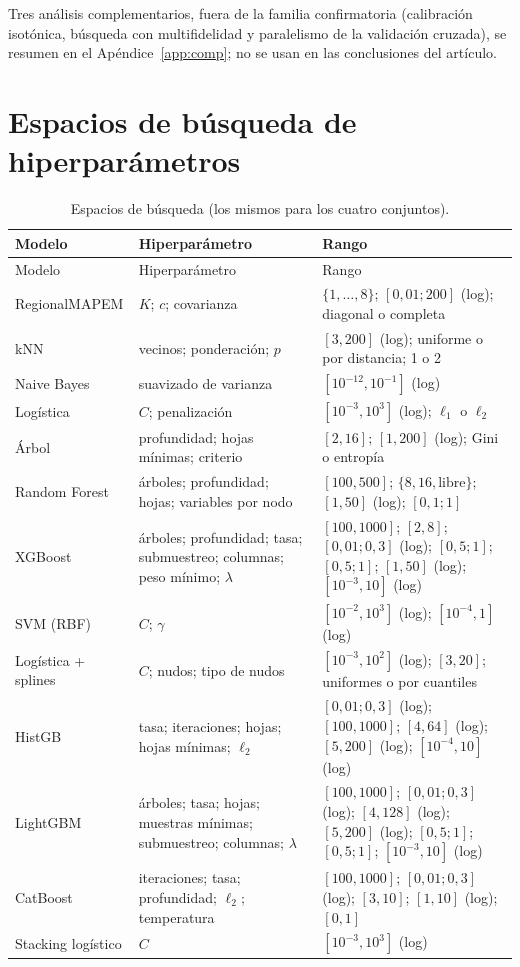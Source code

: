 \documentclass[11pt,a4paper]{article}
\begin{document}
Tres análisis complementarios, fuera de la familia confirmatoria (calibración isotónica, búsqueda con multifidelidad y paralelismo de la validación cruzada), se resumen en el Apéndice~\ref{app:comp}; no se usan en las conclusiones del artículo.

\section{Espacios de búsqueda de hiperparámetros}\label{app:espacios}
{\small
\begin{longtable}{p{2.6cm}p{4.4cm}p{7.2cm}}
\caption{Espacios de búsqueda (los mismos para los cuatro conjuntos).}\label{tab:espacios}\\
\toprule
Modelo & Hiperparámetro & Rango \\
\midrule
\endfirsthead
\toprule
Modelo & Hiperparámetro & Rango \\
\midrule
\endhead
RegionalMAPEM & $K$; $c$; covarianza & $\{1,\dots,8\}$; $[0{,}01;200]$ (log); diagonal o completa \\
kNN & vecinos; ponderación; $p$ & $[3,200]$ (log); uniforme o por distancia; 1 o 2 \\
Naive Bayes & suavizado de varianza & $[10^{-12},10^{-1}]$ (log) \\
Logística & $C$; penalización & $[10^{-3},10^{3}]$ (log); $\ell_1$ o $\ell_2$ \\
Árbol & profundidad; hojas mínimas; criterio & $[2,16]$; $[1,200]$ (log); Gini o entropía \\
Random Forest & árboles; profundidad; hojas; variables por nodo & $[100,500]$; $\{8,16,\text{libre}\}$; $[1,50]$ (log); $[0{,}1;1]$ \\
XGBoost & árboles; profundidad; tasa; submuestreo; columnas; peso mínimo; $\lambda$ & $[100,1000]$; $[2,8]$; $[0{,}01;0{,}3]$ (log); $[0{,}5;1]$; $[0{,}5;1]$; $[1,50]$ (log); $[10^{-3},10]$ (log) \\
SVM (RBF) & $C$; $\gamma$ & $[10^{-2},10^{3}]$ (log); $[10^{-4},1]$ (log) \\
Logística + splines & $C$; nudos; tipo de nudos & $[10^{-3},10^{2}]$ (log); $[3,20]$; uniformes o por cuantiles \\
HistGB & tasa; iteraciones; hojas; hojas mínimas; $\ell_2$ & $[0{,}01;0{,}3]$ (log); $[100,1000]$; $[4,64]$ (log); $[5,200]$ (log); $[10^{-4},10]$ (log) \\
LightGBM & árboles; tasa; hojas; muestras mínimas; submuestreo; columnas; $\lambda$ & $[100,1000]$; $[0{,}01;0{,}3]$ (log); $[4,128]$ (log); $[5,200]$ (log); $[0{,}5;1]$; $[0{,}5;1]$; $[10^{-3},10]$ (log) \\
CatBoost & iteraciones; tasa; profundidad; $\ell_2$; temperatura & $[100,1000]$; $[0{,}01;0{,}3]$ (log); $[3,10]$; $[1,10]$ (log); $[0,1]$ \\
Stacking logístico & $C$ & $[10^{-3},10^{3}]$ (log) \\
\bottomrule
\end{longtable}
}
\end{document}
